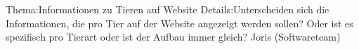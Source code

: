 
%
	{Thema:}{Informationen zu Tieren auf Website}%
	{Details:}{Unterscheiden sich die Informationen, die pro Tier auf der Website angezeigt werden sollen? Oder ist es spezifisch pro Tierart oder ist der Aufbau immer gleich?}%
	{Joris (Softwareteam)}

